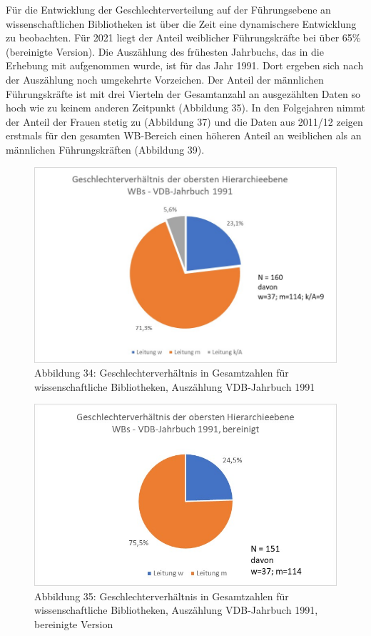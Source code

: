 \documentclass[a4paper,
fontsize=11pt,
oneside,
numbers=noperiodatend,
parskip=half-,
bibliography=totoc,
final
]{scrartcl}
\begin{document}
Für die Entwicklung der Geschlechterverteilung auf der Führungsebene an
wissenschaftlichen Bibliotheken ist über die Zeit eine dynamischere
Entwicklung zu beobachten. Für 2021 liegt der Anteil weiblicher
Führungskräfte bei über 65\% (bereinigte Version). Die Auszählung des
frühesten Jahrbuchs, das in die Erhebung mit aufgenommen wurde, ist für
das Jahr 1991. Dort ergeben sich nach der Auszählung noch umgekehrte
Vorzeichen. Der Anteil der männlichen Führungskräfte ist mit drei
Vierteln der Gesamtanzahl an ausgezählten Daten so hoch wie zu keinem
anderen Zeitpunkt (Abbildung 35). In den Folgejahren nimmt der Anteil
der Frauen stetig zu (Abbildung 37) und die Daten aus 2011/12 zeigen
erstmals für den gesamten WB-Bereich einen höheren Anteil an weiblichen
als an männlichen Führungskräften (Abbildung 39).

\begin{figure}
\centering
\includegraphics{img/Abb_34_VDB-1991_gesamt.jpg}
\caption{Abbildung 34: Geschlechterverhältnis in Gesamtzahlen für
wissenschaftliche Bibliotheken, Auszählung VDB-Jahrbuch 1991}
\end{figure}

\begin{figure}
\centering
\includegraphics{img/Abb_35_VDB-1991_gesamt_bereinigt.jpg}
\caption{Abbildung 35: Geschlechterverhältnis in Gesamtzahlen für
wissenschaftliche Bibliotheken, Auszählung VDB-Jahrbuch 1991, bereinigte
Version}
\end{figure}
\end{document}

